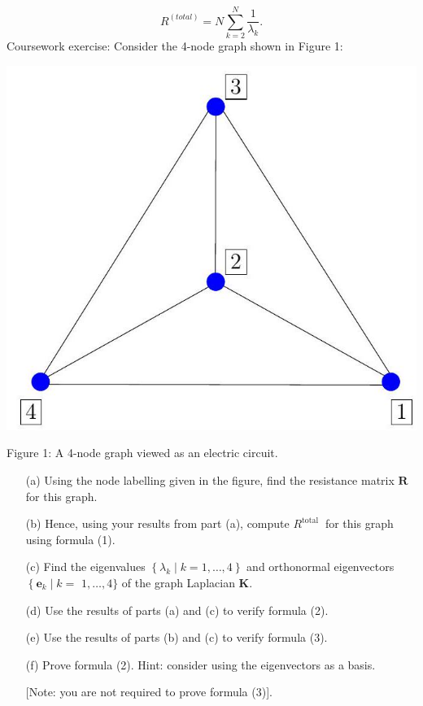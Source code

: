 \documentclass[10pt, a4paper]{article}
\begin{document}
\begin{Problem}
\begin{equation*}
R^{(total)}=N \sum_{k=2}^{N} \frac{1}{\lambda_{k}} .
\end{equation*}
Coursework exercise: Consider the 4-node graph shown in Figure 1:
\begin{center}
\includegraphics[scale=0.25]{2023_02_04_3a1caedc5be036335f24g-2.jpg}
\end{center}
\begin{center}
Figure 1: A 4-node graph viewed as an electric circuit.
\end{center}
\begin{itemize}
\item[(a)] Using the node labelling given in the figure, find the resistance matrix $\mathbf{R}$ for this graph.

\item[(b)] Hence, using your results from part (a), compute $R^{\text {total }}$ for this graph using formula (1).

\item[(c)] Find the eigenvalues $\left\{\lambda_{k} \mid k=1, \ldots, 4\right\}$ and orthonormal eigenvectors $\left\{\mathbf{e}_{k} \mid k=\right.$ $1, \ldots, 4\}$ of the graph Laplacian $\mathbf{K}$.

\item[(d)] Use the results of parts (a) and (c) to verify formula (2).

\item[(e)] Use the results of parts (b) and (c) to verify formula (3).

\item[(f)] Prove formula (2). Hint: consider using the eigenvectors as a basis.

[Note: you are not required to prove formula (3)].
\end{itemize}
\end{Problem}
\end{document}

